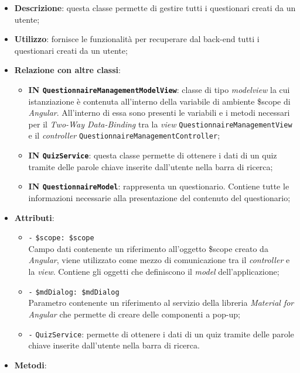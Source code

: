 \begin{itemize}
	\item \textbf{Descrizione}: questa classe permette di gestire tutti i questionari creati da un utente; 
	\item \textbf{Utilizzo}: fornisce le funzionalità per recuperare dal back-end tutti i questionari creati da un utente;
	\item \textbf{Relazione con altre classi}:
	\begin{itemize}
		\item \textbf{IN \texttt{QuestionnaireManagementModelView}}: classe di tipo \textit{modelview} la cui istanziazione è contenuta all'interno della variabile di ambiente \$scope di \textit{Angular}. All'interno di essa sono presenti le variabili e i metodi necessari per il \textit{Two-Way Data-Binding} tra la \textit{view} \texttt{QuestionnaireManagementView} e il \textit{controller} \texttt{QuestionnaireManagementController};
		\item \textbf{IN \texttt{QuizService}}: questa classe permette di ottenere i dati di un quiz tramite delle parole chiave inserite dall'utente nella barra di ricerca;
		\item \textbf{IN \texttt{QuestionnaireModel}}: rappresenta un questionario. Contiene tutte le informazioni necessarie alla presentazione del contenuto del questionario;
	\end{itemize}
	\item \textbf{Attributi}:
	\begin{itemize}
		\item \texttt{-} \texttt{\$scope: \$scope} \\
		Campo dati contenente un riferimento all'oggetto \$scope creato da \textit{Angular}, viene utilizzato come mezzo di comunicazione tra il \textit{controller} e la \textit{view}. Contiene gli oggetti che definiscono il \textit{model} dell'applicazione;
		\item \texttt{-} \texttt{\$mdDialog: \$mdDialog} \\
		Parametro contenente un riferimento al servizio della libreria \textit{Material for Angular} che permette di creare delle componenti a pop-up;
		\item \texttt{-}	 \texttt{QuizService}: permette di ottenere i dati di un quiz tramite delle parole chiave inserite dall'utente nella barra di ricerca.
	\end{itemize}
	\item \textbf{Metodi}:

\end{itemize}
